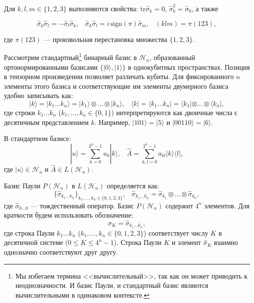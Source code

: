 \documentclass[a4paper]{report}
\begin{document}
Для ${k, l, m \in \{1,2,3\}}$ выполняются свойства:
${\mathrm{tr}\hat{\sigma}_k = 0}$,
${\hat{\sigma}^2_k = \hat{\sigma}_0}$, а также

\begin{equation}\label{eq2}
    \hat{\sigma}_k\hat{\sigma}_l = -\hat{\sigma}_l\hat{\sigma}_k, \;\;\;
    \hat{\sigma}_k\hat{\sigma}_l = i\,\mathrm{sign}(\pi)\hat{\sigma}_m, \;\;\;
    (klm) = \pi(123),
\end{equation}

\noindent где ${\pi(123)}$ — произвольная перестановка множества ${\{1,2,3\}}$.

Рассмотрим стандартный\footnote[1]{Мы избегаем термина <<вычислительный>>, так как он может приводить к неоднозначности. И базис Паули, и стандартный базис являются вычислительными в одинаковом контексте.} бинарный базис в ${\mathcal{H}_n}$, образованный ортонормированными базисами ${\{|0\rangle,|1\rangle\}}$ в однокубитных пространствах. Позиция в тензорном произведении позволяет различать кубиты. Для фиксированного ${n}$ элементы этого базиса и соответствующие им элементы двумерного базиса удобно записывать как:
$${
    |k\rangle = |k_1\ldots k_n\rangle = |k_1\rangle \otimes \ldots \otimes |k_n\rangle,\;\;\;
    \langle k| = \langle k_1\ldots k_n| = \langle k_1|\otimes\ldots\otimes\langle k_n|,
}$$
\noindent где строки ${k_1\ldots k_n}$ (${k_1,\ldots,k_n\in\{0, 1\}}$) интерпретируются как двоичные числа с десятичным представлением ${k}$. Например, ${|101\rangle = |5\rangle}$ и ${|00110\rangle = |6\rangle}$.

В стандартном базисе:
$${
    |u\rangle = \sum_{k=0}^{2^n - 1} u_k |k\rangle, \;\;\;
    \hat{A} = \sum_{k,l=0}^{2^n - 1} a_{kl} |k\rangle\langle l|,
}$$
\noindent где ${|u\rangle \in \mathcal{H}_n}$ и ${\hat{A} \in L(\mathcal{H}_n)}$.

Базис Паули ${P(\mathcal{H}_n)}$ в ${L(\mathcal{H}_n)}$ определяется как:
\begin{equation}\label{eq3}
    \{\hat{\sigma}_{k_1\ldots k_n}\}_{k_1,\ldots,k_n\in\{0,1,2,3\}},\;\;\;
    \hat{\sigma}_{k_1\ldots k_n} = \hat{\sigma}_{k_1}\otimes\ldots\otimes\hat{\sigma}_{k_n},
\end{equation}
\noindent где ${\hat{\sigma}_{0\ldots 0}}$ — тождественный оператор. Базис ${P(\mathcal{H}_n)}$ содержит ${4^n}$ элементов. Для краткости будем использовать обозначение:
$${
    \hat{\sigma}_K = \hat{\sigma}_{k_1\ldots k_n},
}$$
\noindent где строка Паули ${k_1\ldots k_n}$ (${k_1,\ldots,k_n \in \{0,1,2,3\}}$) соответствует числу ${K}$ в десятичной системе (${0 \leq K \leq 4^n - 1}$). Строка Паули ${K}$ и элемент ${\hat{\sigma}_K}$ взаимно однозначно соответствуют друг другу.
\end{document}
